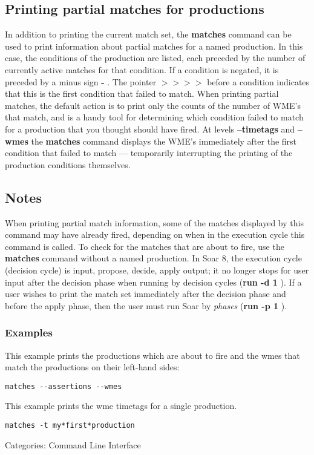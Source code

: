 \subsection*{Printing partial matches for productions}
 In addition to printing the current match set, the \textbf{matches}
 command can be used to print information about partial matches for a named production. In this case, the conditions of the production are listed, each preceded by the number of currently active matches for that condition. If a condition is negated, it is preceded by a minus sign \textbf{-}
. The pointer \textbf{$>$$>$$>$$>$}
 before a condition indicates that this is the first condition that failed to match. 
 When printing partial matches, the default action is to print only the counts of the number of WME's that match, and is a handy tool for determining which condition failed to match for a production that you thought should have fired. At levels \textbf{--timetags}
 and \textbf{--wmes}
 the \textbf{matches}
 command displays the WME's immediately after the first condition that failed to match --- temporarily interrupting the printing of the production conditions themselves. 
\subsection*{Notes}
 When printing partial match information, some of the matches displayed by this command may have already fired, depending on when in the execution cycle this command is called. To check for the matches that are about to fire, use the \textbf{matches}
 command without a named production. 
 In Soar 8, the execution cycle (decision cycle) is input, propose, decide, apply output; it no longer stops for user input after the decision phase when running by decision cycles (\textbf{run -d 1}
). If a user wishes to print the match set immediately after the decision phase and before the apply phase, then the user must run Soar by \emph{phases}
 (\textbf{run -p 1}
). 
\subsubsection*{Examples}
 This example prints the productions which are about to fire and the wmes that match the productions on their left-hand sides: \begin{verbatim}
matches --assertions --wmes
\end{verbatim}
 This example prints the wme timetags for a single production. \begin{verbatim}
matches -t my*first*production
\end{verbatim}
 Categories: Command Line Interface
